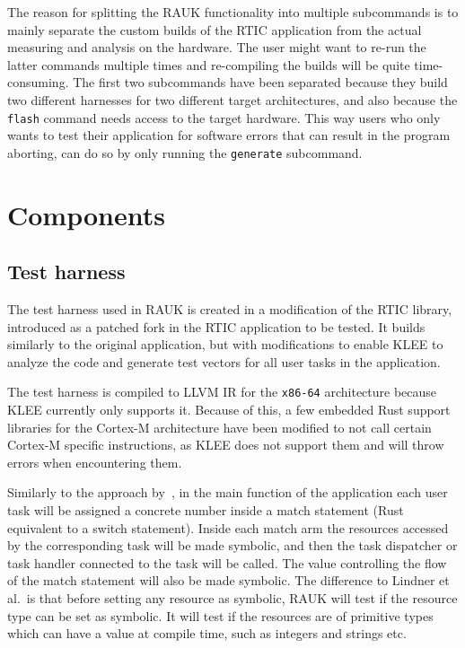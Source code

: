 The reason for splitting the RAUK functionality into multiple subcommands is to
mainly separate the custom builds of the RTIC application from the actual
measuring and analysis on the hardware. The user might want to re-run the latter
commands multiple times and re-compiling the builds will be quite
time-consuming. The first two subcommands have been separated because they
build two different harnesses for two different target architectures, and also
because the \texttt{flash} command needs access to the target hardware. This
way users who only wants to test their application for software errors that can
result in the program aborting, can do so by only running the \texttt{generate}
subcommand.

\section{Components}

\subsection{Test harness}
The test harness used in RAUK is created in a modification of the RTIC library,
introduced as a patched fork in the RTIC application to be tested. It builds
similarly to the original application, but with modifications to enable KLEE to
analyze the code and generate test vectors for all user tasks in the
application.

The test harness is compiled to LLVM IR for the \texttt{x86-64} architecture
because KLEE currently only supports it. Because of this, a few embedded Rust support
libraries for the Cortex-M architecture have been modified to not call certain
Cortex-M specific instructions, as KLEE does not support them and will throw
errors when encountering them.

Similarly to the approach by~\cite{lindner}, in the main function of the
application each user task will be assigned a concrete number inside a match
statement (Rust equivalent to a switch statement). Inside each match arm the
resources accessed by the corresponding task will be made symbolic, and then
the task dispatcher or task handler connected to the task will be called. The
value controlling the flow of the match statement will also be made symbolic.
The difference to Lindner et al.\ is that before setting any resource as
symbolic, RAUK will test if the resource type can be set as symbolic. It
will test if the resources are of primitive types which can have a value at
compile time, such as integers and strings etc.

